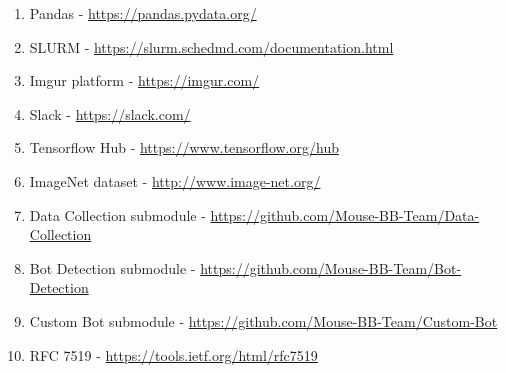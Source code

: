 \begin{enumerate}
    \item Pandas - \url{https://pandas.pydata.org/}\label{itm:pandas}
    \item SLURM - \url{https://slurm.schedmd.com/documentation.html}\label{itm:slurm}
    \item Imgur platform - \url{https://imgur.com/}\label{itm:imgur}
    \item Slack - \url{https://slack.com/}\label{itm:slack}
    \item Tensorflow Hub - \url{https://www.tensorflow.org/hub}\label{itm:tensorflow-hub}
    \item ImageNet dataset - \url{http://www.image-net.org/}\label{itm:image-net}
    \item Data Collection submodule - \url{https://github.com/Mouse-BB-Team/Data-Collection}\label{itm:data-collection}
    \item Bot Detection submodule - \url{https://github.com/Mouse-BB-Team/Bot-Detection}\label{itm:bot-detection}
    \item Custom Bot submodule - \url{https://github.com/Mouse-BB-Team/Custom-Bot}\label{itm:custom-bot}
    \item RFC 7519 - \url{https://tools.ietf.org/html/rfc7519}\label{itm:rfc-jwt}
\end{enumerate}
\newpage
\thispagestyle{appendix}